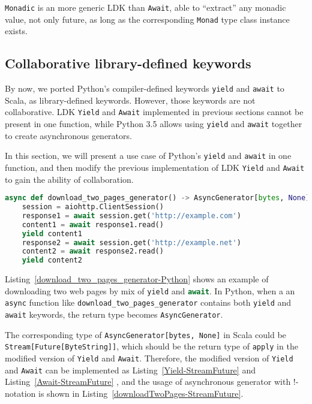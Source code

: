 \lstinline{Monadic} is an more generic LDK than \lstinline{Await}, able to ``extract'' any monadic value, not only future, as long as the corresponding \lstinline{Monad} type class instance exists.

\subsection{Collaborative library-defined keywords}\label{Collaborative library-defined keywords}

By now, we ported Python's compiler-defined keywords \lstinline{yield} and \lstinline{await} to Scala, as library-defined keywords. However, those keywords are not collaborative. LDK \lstinline{Yield} and \lstinline{Await} implemented in previous sections cannot be present in one function, while Python 3.5 allows using \lstinline{yield} and \lstinline{await} together to create asynchronous generators.

In this section, we will present a use case of Python's \lstinline{yield} and \lstinline{await} in one function, and then modify the previous implementation of LDK \lstinline{Yield} and \lstinline{Await} to gain the ability of collaboration.

\begin{lstlisting}[language=Python,style=Python3,caption={Downloading two web pages as an asynchronous generator in Python},label={download_two_pages_generator-Python}]
async def download_two_pages_generator() -> AsyncGenerator[bytes, None]:
    session = aiohttp.ClientSession()
    response1 = await session.get('http://example.com')
    content1 = await response1.read()
    yield content1
    response2 = await session.get('http://example.net')
    content2 = await response2.read()
    yield content2
\end{lstlisting}

Listing~\ref{download_two_pages_generator-Python} shows an example of downloading two web pages by mix of \lstinline{yield} and \lstinline[language=Python,style=Python3]{await}. In Python, when a an \lstinline{async} function like \lstinline{download_two_pages_generator} contains both \lstinline{yield} and \lstinline{await} keywords, the return type becomes \lstinline{AsyncGenerator}.

The corresponding type of \lstinline{AsyncGenerator[bytes, None]} in Scala could be \lstinline{Stream[Future[ByteString]]}, which should be the return type of \lstinline{apply} in the modified version of \lstinline{Yield} and \lstinline{Await}. Therefore, the modified version of \lstinline{Yield} and \lstinline{Await} can be implemented as Listing~\ref{Yield-StreamFuture} and Listing~\ref{Await-StreamFuture} , and the usage of asynchronous generator with !-notation is shown in Listing~\ref{downloadTwoPages-StreamFuture}.

